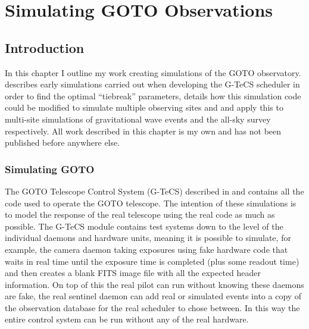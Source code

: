 \chapter{Simulating GOTO Observations}
\label{chap:sims}
\chaptoc{}


\newpage
\section{Introduction}
\label{sec:sims_intro}
\begin{colsection}


\begin{colsection}

In this chapter I outline my work creating simulations of the GOTO observatory.  describes early simulations carried out when developing the G-TeCS scheduler in order to find the optimal ``tiebreak'' parameters,  details how this simulation code could be modified to simulate multiple observing sites and  and  apply this to multi-site simulations of gravitational wave events and the all-sky survey respectively. All work described in this chapter is my own and has not been published before anywhere else.

\end{colsection}


\subsection{Simulating GOTO}
\label{sec:goto_sims}
\begin{colsection}

The GOTO Telescope Control System (G-TeCS) described in  and  contains all the code used to operate the GOTO telescope. The intention of these simulations is to model the response of the real telescope using the real code as much as possible. The G-TeCS module contains test systems down to the level of the individual daemons and hardware units, meaning it is possible to simulate, for example, the camera daemon taking exposures using fake hardware code that waits in real time until the exposure time is completed (plus some readout time) and then creates a blank FITS image file with all the expected header information. On top of this the real pilot can run without knowing these daemons are fake, the real sentinel daemon can add real or simulated events into a copy of the observation database for the real scheduler to chose between. In this way the entire control system can be run without any of the real hardware.


\end{colsection}
\end{colsection}
